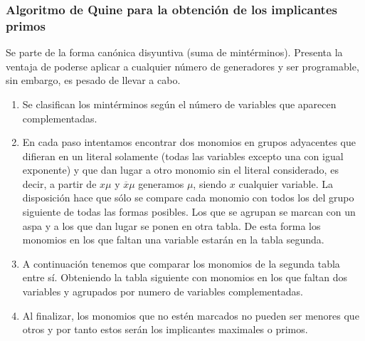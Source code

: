 \subsubsection{Algoritmo de Quine para la obtención de los implicantes primos}
Se parte de la forma canónica disyuntiva (suma de mintérminos). Presenta la ventaja de poderse aplicar a cualquier número de generadores y ser programable, sin embargo, es pesado de llevar a cabo.
\begin{enumerate}
    \item Se clasifican los mintérminos según el número de variables que aparecen complementadas.
    \item En cada paso intentamos encontrar dos monomios en grupos adyacentes que difieran en un literal solamente
          (todas las variables excepto una con igual exponente) y que dan lugar a otro monomio sin el literal considerado,
          es decir, a partir de $x\mu$ y $\overline{x}\mu$ generamos $\mu$, siendo $x$ cualquier variable. La disposición hace que sólo se compare
          cada monomio con todos los del grupo siguiente de todas las formas posibles. Los que se agrupan se marcan
          con un aspa y a los que dan lugar se ponen en otra tabla. De esta forma los monomios en los que faltan una
          variable estarán en la tabla segunda.
    \item A continuación tenemos que comparar los monomios de la segunda tabla entre sí. Obteniendo la tabla siguiente con monomios en los que faltan dos variables y agrupados por numero de variables complementadas.
    \item Al finalizar, los monomios que no estén marcados no pueden ser menores que otros y por tanto estos serán los implicantes maximales o primos.
\end{enumerate}

